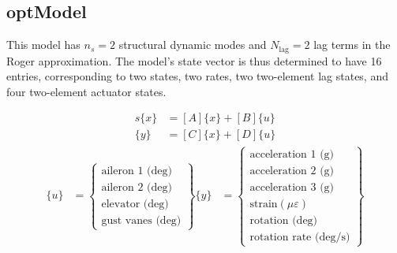 \begin{landscape}

\chapter{optModel}
\label{ap:optSS}

This model has $n_s=2$ structural dynamic modes and $N_\text{lag}=2$ lag terms in the Roger approximation. The model's state vector is thus determined to have 16 entries, corresponding to two states, two rates, two two-element lag states, and four two-element actuator states.

\begin{align*}
	s\{x\} &= [A]\{x\} + [B]\{u\} \\
	\{y\} &= [C]\{x\} + [D]\{u\}
\end{align*}
\begin{align*}
	\{u\} &= \begin{Bmatrix}
		\text{aileron 1 (deg)} \\
		\text{aileron 2 (deg)} \\
		\text{elevator (deg)} \\
		\text{gust vanes (deg)}
	\end{Bmatrix}
	\{y\} &= \begin{Bmatrix}
		\text{acceleration 1 (g)} \\
		\text{acceleration 2 (g)} \\
		\text{acceleration 3 (g)} \\
		\text{strain} (\mu\varepsilon) \\
		\text{rotation (deg)} \\
		\text{rotation rate (deg/s)}
	\end{Bmatrix}
\end{align*}


\end{landscape}
